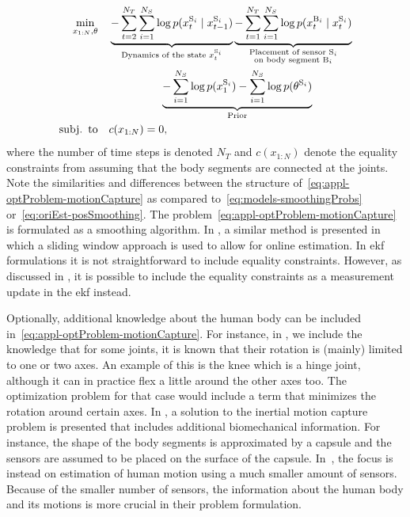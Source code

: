 \begin{align}\label{eq:appl-optProblem-motionCapture}
\min_{x_{1:N},\theta} & \quad 
\underbrace{- \sum_{t = 2}^{N_T} \sum_{i = 1}^{N_S} \log p(x^{\text{S}_i}_t \mid x^{\text{S}_i}_{t-1})}_{\text{Dynamics of the state }x^{\text{S}_i}_t}
\underbrace{- \sum_{t = 1}^{N_T} \sum_{i = 1}^{N_S} \log p(x^{\text{B}_i}_t \mid x^{\text{S}_i}_{t})}_{\begin{subarray}{c}\text{Placement of sensor $\text{S}_i$}\\
    \text{on body segment $\text{B}_i$}\end{subarray}}
     \nonumber \\
& \hspace{20mm}\underbrace{- \sum_{i = 1}^{N_S} \log p(x^{\text{S}_i}_1) - \sum_{i = 1}^{N_S}\log p(\theta^{\text{S}_i})}_{\text{Prior}}
\nonumber \\
\st& \quad c(x_{1:N}) = 0,
\end{align}
where the number of time steps is denoted $N_T$ and $c(x_{1:N})$ denote the equality constraints from assuming that the body segments are connected at the joints. Note the similarities and differences between the structure of~\eqref{eq:appl-optProblem-motionCapture} as compared to~\eqref{eq:models-smoothingProbs} or~\eqref{eq:oriEst-posSmoothing}. The problem~\eqref{eq:appl-optProblem-motionCapture} is formulated as a smoothing algorithm. In \cite{miezalTB:2016}, a similar method is presented in which a sliding window approach is used to allow for online estimation. In \gls{ekf} formulations it is not straightforward to include equality constraints. However, as discussed in \cite{miezalTB:2016}, it is possible to include the equality constraints as a measurement update in the \gls{ekf} instead. 

Optionally, additional knowledge about the human body can be included in~\eqref{eq:appl-optProblem-motionCapture}. For instance, in \cite{kokHS:2014}, we include the knowledge that for some joints, it is known that their rotation is (mainly) limited to one or two axes. An example of this is the knee which is a hinge joint, although it can in practice flex a little around the other axes too. The optimization problem for that case would include a term that minimizes the rotation around certain axes. In \cite{taetzBM:2016}, a solution to the inertial motion capture problem is presented that includes additional biomechanical information. For instance, the shape of the body segments is approximated by a capsule and the sensors are assumed to be placed on the surface of the capsule. In~\cite{marcardRBP:2017}, the focus is instead on estimation of human motion using a much smaller amount of sensors. Because of the smaller number of sensors, the information about the human body and its motions is more crucial in their problem formulation. 

